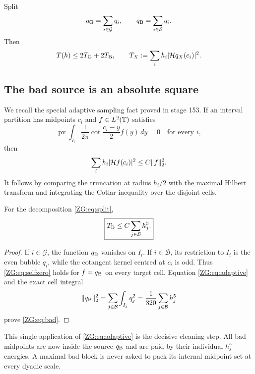 Split
\begin{equation}\label{ZG:eq:split}
 q_{\rm G}=\sum_{i\in\mathcal G}q_i,
 \qquad q_{\rm B}=\sum_{i\in\mathcal B}q_i.
\end{equation}
Then
\begin{equation}\label{ZG:eq:Tsplit}
 T(h)\le2T_{\rm G}+2T_{\rm B},
 \qquad
 T_X:=\sum_i h_i|\mathcal H q_X(c_i)|^2.
\end{equation}

\subsection{The bad source is an absolute square}

We recall the special adaptive sampling fact proved in stage 153.  If an
interval partition has midpoints $c_i$ and $f\in L^2(\mathbb T)$ satisfies
\begin{equation}\label{ZG:eq:selfzero}
 \operatorname {pv}\int_{I_i}\frac1{2\pi}
 \cot\frac{c_i-y}{2}f(y)\,dy=0
 \quad\text{for every }i,
\end{equation}
then
\begin{equation}\label{ZG:eq:adaptive}
 \sum_i h_i|\mathcal H f(c_i)|^2\le C\|f\|_2^2.
\end{equation}
It follows by comparing the truncation at radius $h_i/2$ with the
maximal Hilbert transform and integrating the Cotlar inequality over the
disjoint cells.

\begin{lemma}\label{ZG:lem:bad}
For the decomposition \eqref{ZG:eq:split},
\begin{equation}\label{ZG:eq:bad}
 \boxed{
 T_{\rm B}\le C\sum_{j\in\mathcal B}h_j^5.}
\end{equation}
\end{lemma}

\begin{proof}
If $i\in\mathcal G$, the function $q_{\rm B}$ vanishes on $I_i$.  If
$i\in\mathcal B$, its restriction to $I_i$ is the even bubble $q_i$,
while the cotangent kernel centred at $c_i$ is odd.  Thus
\eqref{ZG:eq:selfzero} holds for $f=q_{\rm B}$ on every target cell.
Equation \eqref{ZG:eq:adaptive} and the exact cell integral
\[
 \|q_{\rm B}\|_2^2
 =\sum_{j\in\mathcal B}\int_{I_j}q_j^2
 =\frac1{320}\sum_{j\in\mathcal B}h_j^5
\]
prove \eqref{ZG:eq:bad}.
\end{proof}

\begin{remark}
This single application of \eqref{ZG:eq:adaptive} is the decisive cleaning
step.  All bad midpoints are now inside the source $q_{\rm B}$ and are
paid by their individual $h_j^5$ energies.  A maximal bad block is never
asked to pack its internal midpoint set at every dyadic scale.
\end{remark}

